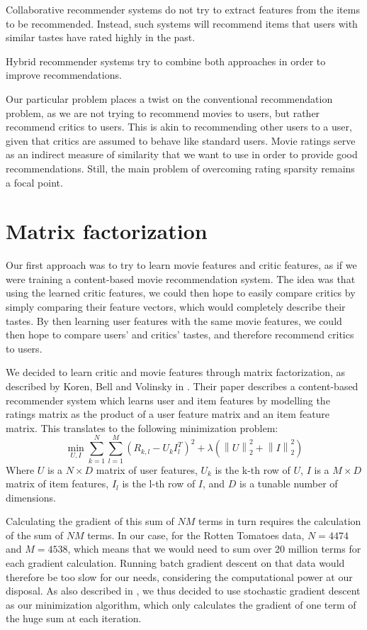 \documentclass[10.5pt]{article}
\newcommand{\norm}[1]{\left\lVert#1\right\rVert}
\begin{document}
Collaborative recommender systems do not try to extract features from the items
to be recommended. Instead, such systems will recommend items that users with
similar tastes have rated highly in the past.

Hybrid recommender systems try to combine both approaches in order to improve
recommendations.

Our particular problem places a twist on the conventional recommendation
problem, as we are not trying to recommend movies to users, but rather
recommend critics to users. This is akin to recommending other users
to a user, given that critics are assumed to behave like standard users.
Movie ratings
serve as an indirect measure of similarity that we want to use in order to
provide good recommendations. Still, the main problem of overcoming rating
sparsity remains a focal point.

\section{Matrix factorization}

Our first approach was to try to learn movie features and critic features, as if
we were training a content-based movie recommendation system. The idea was that 
using the learned critic features, we could then hope to easily compare critics 
by simply comparing their feature vectors, which would completely describe 
their tastes. By then learning user features with the same movie features, we 
could then hope to compare users' and critics' tastes, and therefore recommend 
critics to users. 

We decided to learn critic and movie features through matrix factorization, as
described by Koren, Bell and Volinsky in \cite{Koren09}. Their paper describes
a content-based recommender system which learns user and item features by
modelling the ratings matrix as the product of a user feature matrix and an 
item feature matrix. This translates to the following minimization problem:
$$ \min_{U,I} \sum_{k = 1}^{N} \sum_{l = 1}^{M} (R_{k,l} - U_k I_l^T)^2 
+ \lambda (\norm{U}_2^2 + \norm{I}_2^2) $$
Where $U$ is a $N \times D$ matrix of user features, $U_k$ is the k-th row of
$U$, $I$ is a $M \times D$ matrix of item features, $I_l$ is the l-th row of
$I$, and $D$ is a tunable number of dimensions.

Calculating the gradient of this sum of $NM$ terms in turn requires the
calculation of the sum of $NM$ terms. In our case, for the Rotten Tomatoes 
data, $N = 4474$ and $M = 4538$, which means that we would need to sum over 20
million terms for each gradient calculation. Running batch gradient descent on
that data would therefore be too slow for our needs, considering the
computational power at our disposal. As also described in \cite{Koren09}, we
thus decided to use stochastic gradient descent as our minimization algorithm,
which only calculates the gradient of one term of the huge sum at each
iteration.
\end{document}
